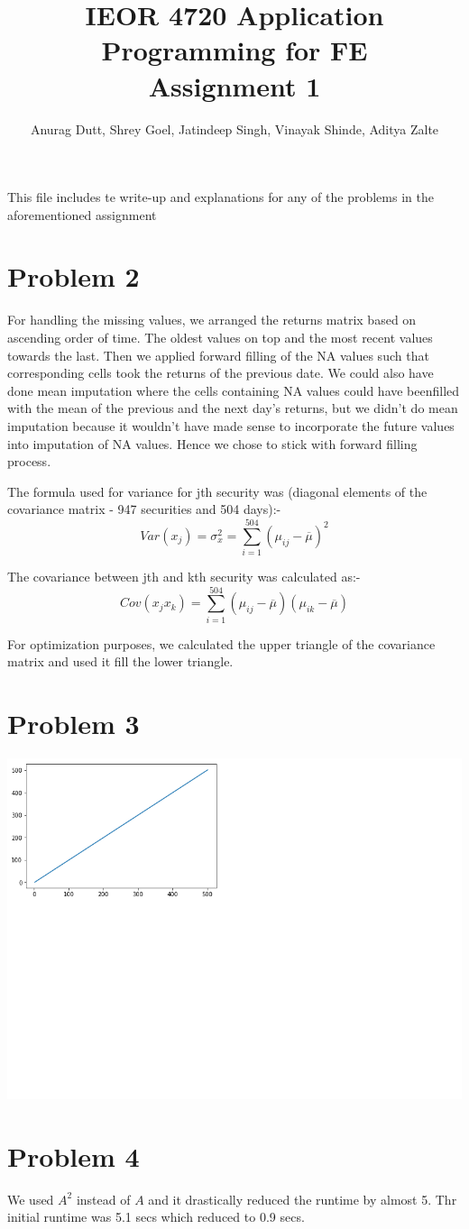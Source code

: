 \documentclass[twoside,11pt]{article}
\title{IEOR 4720 Application Programming for FE \\
  \large Assignment 1
} %
\author{Anurag Dutt, Shrey Goel, Jatindeep Singh, Vinayak Shinde, Aditya Zalte}    %
\begin{document}
\maketitle
This file includes te write-up and explanations for any of the problems in the aforementioned assignment

\section*{Problem 2}
For handling the missing values, we arranged the returns matrix	based on ascending order of time. The oldest values on top and the most	recent values towards the last.	Then we	applied	forward filling of the NA values such	that corresponding cells took the returns of the previous date.	We could also have done	mean imputation	where the cells	containing NA values could have	beenfilled with the mean of the previous and	the next day's returns,	but we didn't do mean imputation because it wouldn't have made sense to	incorporate the	future values into imputation of NA values. Hence we chose to stick with forward filling process.

The formula used for variance for jth security was (diagonal elements of the covariance matrix - 947 securities and 504 days):-
\begin{equation}
  Var(x_j) = \sigma_x^2 = \sum_{i = 1}^{504} (\mu_{ij}-\overline{\mu})^2
\end{equation}

The covariance between jth and kth security was calculated as:-
\begin{equation}
  Cov(x_jx_k) = \sum_{i = 1}^{504} (\mu_{ij}-\overline{\mu})(\mu_{ik}-\overline{\mu})
\end{equation}

For optimization purposes, we calculated the upper triangle of the covariance matrix and used it fill the lower triangle.

\section*{Problem 3}

\includegraphics{graph_q3.png}

\section*{Problem 4}
We used	$A^2$ instead of $A$ and it drastically reduced the runtime by almost 5. Thr initial runtime was 5.1 secs which reduced to 0.9 secs.
\end{document}
